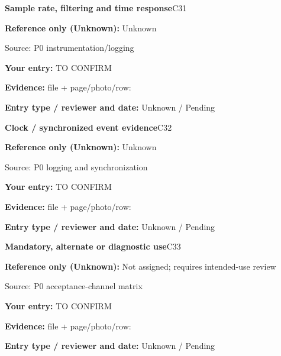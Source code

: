 \documentclass[11pt]{article}
\begin{document}
\par\noindent\begin{minipage}{\textwidth}\small
{\color{navy}\bfseries Sample rate, filtering and time response}\hfill C31\par
\colorbox{pale}{\parbox{\dimexpr\linewidth-2\fboxsep\relax}{
\textbf{Reference only (Unknown):} Unknown\par
{\footnotesize Source: P0 instrumentation/logging}}}\par
\textbf{Your entry:} {\color{muted}TO CONFIRM}\enspace\hrulefill\par
{\footnotesize\textbf{Evidence:} file + page/photo/row: \hrulefill\par
\textbf{Entry type / reviewer and date:} Unknown / Pending\par
}\end{minipage}\par\vspace{5pt}
\par\noindent\begin{minipage}{\textwidth}\small
{\color{navy}\bfseries Clock / synchronized event evidence}\hfill C32\par
\colorbox{pale}{\parbox{\dimexpr\linewidth-2\fboxsep\relax}{
\textbf{Reference only (Unknown):} Unknown\par
{\footnotesize Source: P0 logging and synchronization}}}\par
\textbf{Your entry:} {\color{muted}TO CONFIRM}\enspace\hrulefill\par
{\footnotesize\textbf{Evidence:} file + page/photo/row: \hrulefill\par
\textbf{Entry type / reviewer and date:} Unknown / Pending\par
}\end{minipage}\par\vspace{5pt}
\par\noindent\begin{minipage}{\textwidth}\small
{\color{navy}\bfseries Mandatory, alternate or diagnostic use}\hfill C33\par
\colorbox{pale}{\parbox{\dimexpr\linewidth-2\fboxsep\relax}{
\textbf{Reference only (Unknown):} Not assigned; requires intended-use review\par
{\footnotesize Source: P0 acceptance-channel matrix}}}\par
\textbf{Your entry:} {\color{muted}TO CONFIRM}\enspace\hrulefill\par
{\footnotesize\textbf{Evidence:} file + page/photo/row: \hrulefill\par
\textbf{Entry type / reviewer and date:} Unknown / Pending\par
}\end{minipage}\par\vspace{5pt}
\end{document}
